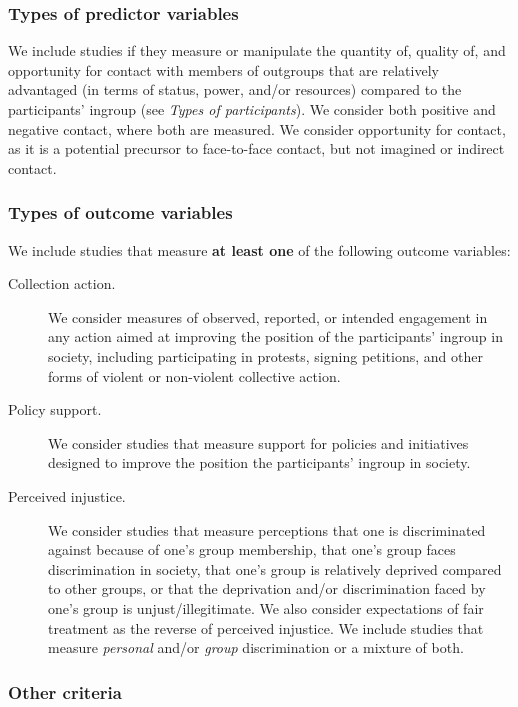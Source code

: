 \documentclass[10pt, a4paper]{article}
\begin{document}
\subsubsection{Types of predictor variables}
\label{sec:predictor-variables}

We include studies if they measure or manipulate the quantity of, quality of, and opportunity for contact with members of outgroups that are relatively advantaged (in terms of status, power, and/or resources) compared to the participants' ingroup (see \emph{Types of participants}). We consider both positive and negative contact, where both are measured. We consider opportunity for contact, as it is a potential precursor to face-to-face contact, but not imagined or indirect contact.

\subsubsection{Types of outcome variables}
\label{sec:outcome-variables}

We include studies that measure \textbf{at least one} of the following outcome variables:

\begin{description}
\item[Collection action.] We consider measures of observed, reported, or intended engagement in any action aimed at improving the position of the participants' ingroup in society, including participating in protests, signing petitions, and other forms of violent or non-violent collective action. 
\item[Policy support.] We consider studies that measure support for policies and initiatives designed to improve the position the participants' ingroup in society.
\item[Perceived injustice.] We consider studies that measure perceptions that one is discriminated against because of one's group membership, that one's group faces discrimination in society, that one's group is relatively deprived compared to other groups, or that the deprivation and/or discrimination faced by one's group is unjust/illegitimate. We also consider expectations of fair treatment as the reverse of perceived injustice. We include studies that measure \textit{personal} and/or \textit{group} discrimination or a mixture of both.
\end{description}

\subsubsection{Other criteria}
\end{document}
